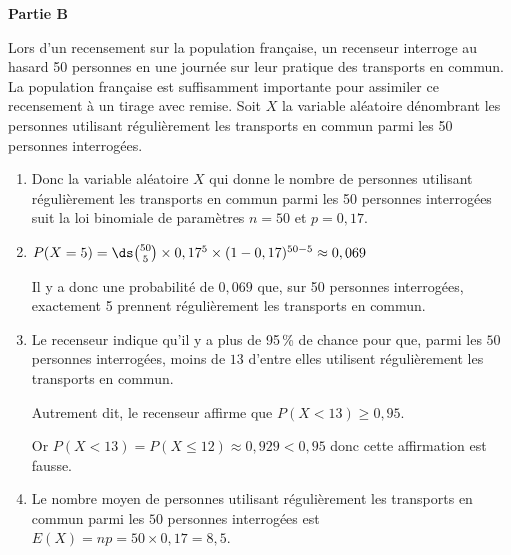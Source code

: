 \bigskip

\textbf{Partie B}

\medskip

Lors d'un recensement sur la population française, un recenseur interroge au hasard 50 personnes en une journée sur leur pratique des transports en commun. 
La population française est suffisamment importante pour assimiler ce recensement à un tirage avec remise.
Soit $X$ la variable aléatoire dénombrant les personnes utilisant régulièrement les transports en commun parmi les 50 personnes interrogées.



\begin{enumerate}
\item 
{}

Donc la variable aléatoire $X$ qui donne le nombre de personnes utilisant régulièrement les transports en commun parmi les 50 personnes interrogées suit la loi binomiale de paramètres $n=50$ et $p=0,17$.

\item $P(X = 5) = \ds\binom{50}{5}\times 0,17^5 \times (1-0,17)^{50-5}\approx 0,069$


Il y a donc une probabilité de $0,069$ que, sur 50 personnes interrogées, exactement 5 prennent régulièrement les transports en commun.

\item Le recenseur indique qu'il y a plus de 95\,\% de chance pour que, parmi les $50$ personnes interrogées, moins de $13$ d'entre elles utilisent régulièrement les transports en commun.

Autrement dit, le recenseur affirme que $P(X<13) \geqslant 0,95$.

Or $P(X<13)= P(X \leqslant 12) \approx  0,929 < 0,95$ donc cette affirmation est fausse.

\item Le nombre moyen de personnes utilisant régulièrement les transports en commun parmi les $50$ personnes interrogées est
$E(X)=np=50\times 0,17 = 8,5$.
\end{enumerate}

\bigskip
